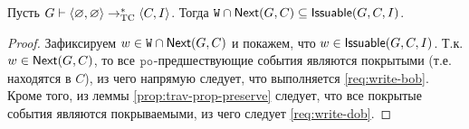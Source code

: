 \begin{proposition}
  \label{prop:next-write}
  Пусть $G \vdash {\langle{\varnothing, \varnothing}\rangle} \rightarrow_{\rm TC}^{*} {\langle{C, I}\rangle}$.
  Тогда ${\mathtt{W}} \cap {\sf Next}(G, C) \subseteq {\sf Issuable}(G,C,I)$.
\end{proposition}
\begin{proof}
  Зафиксируем $w \in {\mathtt{W}} \cap {\sf Next}(G, C)$ и покажем, что $w \in {\sf Issuable}(G, C, I)$.
  Т.к. $w \in {\sf Next}(G, C)$, то все $\lPO$-предшествующие события являются покрытыми (т.е.
  находятся в $C$), из чего напрямую следует, что выполняется \ref{req:write-bob}. Кроме того, из леммы
  \ref{prop:trav-prop-preserve} следует, что все покрытые события являются покрываемыми, из чего следует
  \ref{req:write-dob}.
\end{proof}

